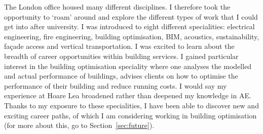 The London office housed many different disciplines.
I therefore took the opportunity to `roam' around and explore the different types of work that I could get into after university.
I was introduced to eight different specialities:
electrical engineering,
fire engineering,
building optimisation,
BIM,
acoustics,
sustainability,
façade access and
vertical transportation.
I was excited to learn about the breadth of career opportunities within building services.
I gained particular interest in the building optimisation speciality where one analyses the modelled and actual performance of buildings, advises clients on how to optimise the performance of their building and reduce running costs.
I would say my experience at Hoare Lea broadened rather than deepened my knowledge in AE.
Thanks to my exposure to these specialities, I have been able to discover new and exciting career paths, of which I am considering working in building optimisation (for more about this, go to Section~\ref{sec:future}).